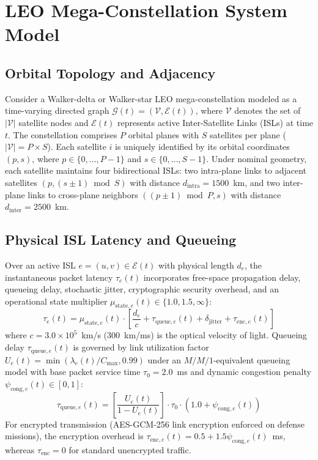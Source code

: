 \documentclass[journal]{IEEEtran}
\begin{document}
\section{LEO Mega-Constellation System Model}
\subsection{Orbital Topology and Adjacency}
Consider a Walker-delta or Walker-star LEO mega-constellation modeled as a time-varying directed graph $\mathcal{G}(t) = (\mathcal{V}, \mathcal{E}(t))$, where $\mathcal{V}$ denotes the set of $|\mathcal{V}|$ satellite nodes and $\mathcal{E}(t)$ represents active Inter-Satellite Links (ISLs) at time $t$. The constellation comprises $P$ orbital planes with $S$ satellites per plane ($|\mathcal{V}| = P \times S$). Each satellite $i$ is uniquely identified by its orbital coordinates $(p, s)$, where $p \in \{0, \dots, P-1\}$ and $s \in \{0, \dots, S-1\}$. Under nominal geometry, each satellite maintains four bidirectional ISLs: two intra-plane links to adjacent satellites $(p, (s \pm 1) \bmod S)$ with distance $d_{\text{intra}} = 1500$~km, and two inter-plane links to cross-plane neighbors $((p \pm 1) \bmod P, s)$ with distance $d_{\text{inter}} = 2500$~km.

\subsection{Physical ISL Latency and Queueing}
Over an active ISL $e = (u, v) \in \mathcal{E}(t)$ with physical length $d_e$, the instantaneous packet latency $\tau_e(t)$ incorporates free-space propagation delay, queueing delay, stochastic jitter, cryptographic security overhead, and an operational state multiplier $\mu_{\text{state},e}(t) \in \{1.0, 1.5, \infty\}$:
\begin{equation}
\tau_e(t) = \mu_{\text{state},e}(t) \cdot \left[ \frac{d_e}{c} + \tau_{\text{queue},e}(t) + \delta_{\text{jitter}} + \tau_{\text{enc},e}(t) \right]
\label{eq:latency}
\end{equation}
where $c = 3.0 \times 10^5$~km/s ($300$~km/ms) is the optical velocity of light. Queueing delay $\tau_{\text{queue},e}(t)$ is governed by link utilization factor $U_e(t) = \min(\lambda_e(t) / C_{\max}, 0.99)$ under an $M/M/1$-equivalent queueing model with base packet service time $\tau_0 = 2.0$~ms and dynamic congestion penalty $\psi_{\text{cong},e}(t) \in [0, 1]$:
\begin{equation}
\tau_{\text{queue},e}(t) = \left[ \frac{U_e(t)}{1 - U_e(t)} \right] \cdot \tau_0 \cdot \left(1.0 + \psi_{\text{cong},e}(t)\right)
\label{eq:queue}
\end{equation}
For encrypted transmission (AES-GCM-256 link encryption enforced on defense missions), the encryption overhead is $\tau_{\text{enc},e}(t) = 0.5 + 1.5 \psi_{\text{cong},e}(t)$~ms, whereas $\tau_{\text{enc}} = 0$ for standard unencrypted traffic.
\end{document}
